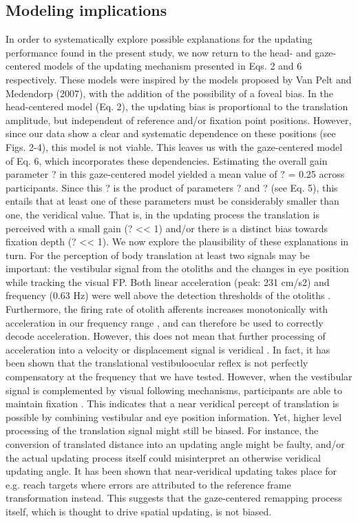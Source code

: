 \subsection{Modeling implications}

In order to systematically explore possible explanations for the updating performance found in the present study, we now return to the head- and gaze-centered models of the updating mechanism presented in Eqs. 2 and 6 respectively. These models were inspired by the models proposed by Van Pelt and Medendorp (2007), with the addition of the possibility of a foveal bias. In the head-centered model (Eq. 2), the updating bias is proportional to the translation amplitude, but independent of reference and/or fixation point positions. However, since our data show a clear and systematic dependence on these positions (see Figs. 2-4), this model is not viable.
This leaves us with the gaze-centered model of Eq. 6, which incorporates these dependencies. Estimating the overall gain parameter ? in this gaze-centered model yielded a mean value of ? = 0.25 across participants. Since this ? is the product of parameters ? and ? (see Eq. 5), this entails that at least one of these parameters must be considerably smaller than one, the veridical value. That is, in the updating process the translation is perceived with a small gain (? << 1) and/or there is a distinct bias towards fixation depth (? << 1). We now explore the plausibility of these explanations in turn. 
For the perception of body translation at least two signals may be important: the vestibular signal from the otoliths and the changes in eye position while tracking the visual FP. Both linear acceleration (peak: 231 cm/s2) and frequency (0.63 Hz) were well above the detection thresholds of the otoliths \cite{benson1986, yu2012}. Furthermore, the firing rate of otolith afferents increases monotonically with acceleration in our frequency range \cite{fernandez1976, yu2012}, and can therefore be used to correctly decode acceleration. However, this does not mean that further processing of acceleration into a velocity or displacement signal is veridical \cite{merfeld2005}. In fact, it has been shown that the translational vestibuloocular reflex is not perfectly compensatory at the frequency that we have tested. However, when the vestibular signal is complemented by visual following mechanisms, participants are able to maintain fixation \cite{medendorp2002, paige1998}. This indicates that a near veridical percept of translation is possible by combining vestibular and eye position information. Yet, higher level processing of the translation signal might still be biased. For instance, the conversion of translated distance into an updating angle might be faulty, and/or the actual updating process itself could misinterpret an otherwise veridical updating angle. It has been shown that near-veridical updating takes place for e.g. reach targets \cite{henriques1998, vanpelt2007} where errors are attributed to the reference frame transformation instead. This suggests that the gaze-centered remapping process itself, which is thought to drive spatial updating, is not biased.
